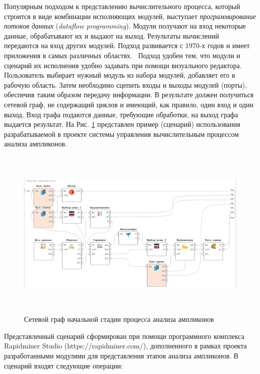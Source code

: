 \documentclass[a4paper,12pt,openany,final]{extreport}
\begin{document}
Популярным подходом к представлению вычислительного процесса, который
строится в виде комбинации исполняющих модулей, выступает
\emph{программирование потоков данных} (\emph{dataflow programming}).
Модули получают на вход некоторые данные, обрабатывают их и выдают на
выход. Результаты вычислений передаются на вход других модулей. Подход
развивается с 1970-х годов и имеет приложения в самых различных
областях. ~Подход удобен тем, что модули и сценарий их исполнения удобно
задавать при помощи визуального редактора. Пользователь выбирает нужный
модуль из набора модулей, добавляет его в рабочую область. Затем
необходимо сцепить входы и выходы модулей (порты), обеспечив таким
образом передачу информации. В результате должен получиться сетевой
граф, не содержащий циклов и имеющий, как правило, один вход и один
выход. Вход графа подаются данные, требующие обработки, на выход графа
выдается результат. На Рис. \ref{fig:ampl-an} представлен пример (сценарий)
использования разрабатываемой в проекте системы управления
вычислительным процессом анализа ампликонов.~

\begin{figure}[htbp]
\includegraphics[width=6.26944in,height=3.24653in]{media/image14.png}
\caption{Сетевой граф начальной стадии процесса анализа ампликонов}
\label{fig:ampl-an}
\end{figure}

Представленный сценарий сформирован при помощи программного комплекса
Rapidminer Studio (https://rapidminer.com/), дополненного в рамках
проекта разработанными модулями для представления этапов анализа
ампликонов. В сценарий входят следующие операции:
\end{document}
